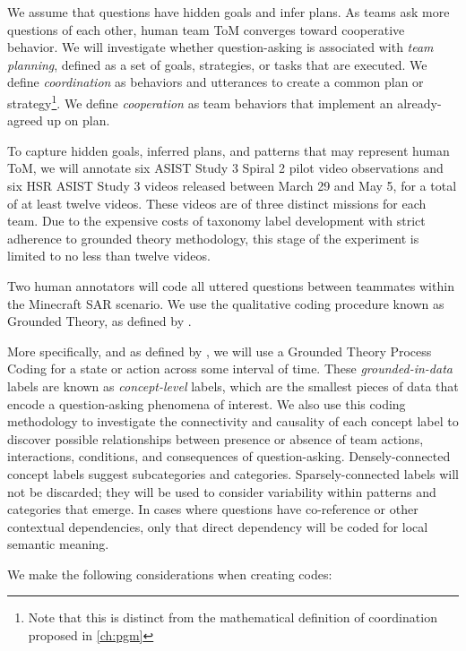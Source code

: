 \documentclass[10pt]{article}
\begin{document}
We assume that questions have hidden goals and infer plans. As teams ask more
questions of each other, human team ToM converges toward cooperative behavior.
We will investigate whether question-asking is associated with \emph{team
planning}, defined as a set of goals, strategies, or tasks that are executed.
We define \emph{coordination} as behaviors and utterances to create a common
plan or strategy\footnote{Note that this is distinct from the mathematical
definition of coordination proposed in \autoref{ch:pgm}}. We define
\emph{cooperation} as team behaviors that implement an already-agreed up on
plan.

To capture hidden goals, inferred plans, and patterns that may represent human
ToM, we will annotate six ASIST Study 3 Spiral 2 pilot video observations and
six HSR ASIST Study 3 videos released between March 29 and May 5, for a total
of at least twelve videos. These videos are of three distinct missions for each
team. Due to the expensive costs of taxonomy label development with strict
adherence to grounded theory methodology, this stage of the experiment is
limited to no less than twelve videos. 

Two human annotators will code all uttered questions between teammates within the Minecraft SAR scenario.
We use the qualitative coding procedure known as Grounded Theory,
as defined by \citet{corbin_strauss_2015}. 

More specifically, and as defined by \citet{saldana_2021}, we will use a
Grounded Theory Process Coding for a state or action across some interval of
time. These \emph{grounded-in-data} labels are known as \emph{concept-level}
labels, which are the smallest pieces of data that encode a question-asking
phenomena of interest. We also use this coding methodology to investigate the connectivity and
causality of each concept label to discover possible relationships between
presence or absence of team actions, interactions, conditions, and consequences
of question-asking. Densely-connected concept labels suggest subcategories and
categories. Sparsely-connected labels will not be discarded; they will be used
to consider variability within patterns and categories that emerge. In cases
where questions have co-reference or other contextual dependencies, only that
direct dependency will be coded for local semantic meaning.

We make the following considerations when creating codes: 
\end{document}
